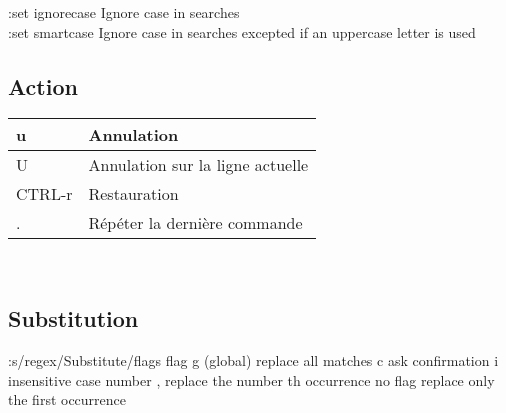 \documentclass{article}
\begin{document}
                    :set ignorecase Ignore case in searches\\
                    :set smartcase Ignore case in searches excepted if an uppercase letter is used

                    \subsection{Action}
                    \begin{tabular}{|p{4cm}| l| }\hline
                        u & Annulation \\ \hline
                        U & Annulation sur la ligne actuelle \\ \hline
                        CTRL-r & Restauration \\ \hline
                        .  & Répéter la dernière commande \\ \hline
                    \end{tabular}\\

                    \subsection{Substitution}
                    :s/regex/Substitute/flags
                    flag g (global) replace all matches
                    c ask confirmation
                    i insensitive case
                    number , replace the number th occurrence
                    no flag replace only the first occurrence
\end{document}

